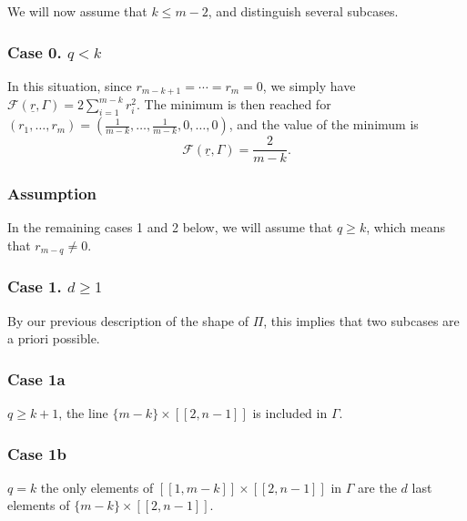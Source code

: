 \documentclass[JEP,XML,SOM,Unicode, NoEqCountersInSection,NoFloatCountersInSection,published]{cedram}
\let\mathcal\mathscr
\newcommand{\llbracket}{[\![}
\newcommand{\rrbracket}{]\!]}
\theoremstyle{theorem}
\theoremstyle{definition}
\begin{document}
We will now assume that $k \leq m - 2$, and distinguish several subcases.

\subsubsection*{Case 0. $q < k$}
In this situation, since $r_{m-k+1} =\cdots= r_m = 0$, we simply have $\mathcal F(\underline{r}, \Gamma) = 2 \sum_{i = 1}^{m-k} r_i^2$. The minimum is then reached for $(r_1,\dots, r_m) = (\frac{1}{m-k},\dots, \frac{1}{m-k}, 0,\dots, 0)$, and the value of the minimum is
\[
\mathcal F(\underline{r}, \Gamma) = \frac{2}{m-k}.
\]

\subsubsection*{Assumption}
In the remaining cases 1 and 2 below, we will assume that $q \geq k$, which means that $r_{m-q} \neq 0$.

\subsubsection*{Case 1. $d \geq 1$}

By our previous description of the shape of $\Pi$, this implies that two subcases are a priori possible.

\subsubsection*{Case 1a} $q \geq k + 1$, \ie the line $\{m-k\} \times \llbracket 2, n-1 \rrbracket$ is included in $\Gamma$.

\subsubsection*{Case 1b} $q = k$ \ie the only elements of $\llbracket 1, m - k \rrbracket \times \llbracket 2, n-1 \rrbracket$ in $\Gamma$ are the $d$ last elements of $\{m-k\} \times \llbracket 2, n-1 \rrbracket$.
\end{document}
